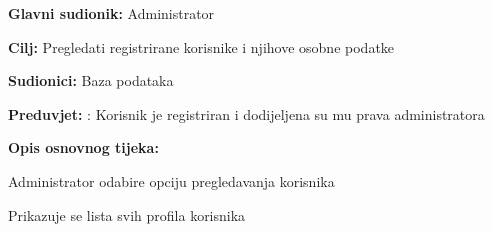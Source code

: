 			
				\noindent {}
				\begin{packed_item}
					
					\item \textbf{Glavni sudionik:} Administrator
					\item  \textbf{Cilj:} Pregledati registrirane korisnike i njihove osobne podatke
					\item  \textbf{Sudionici:} Baza podataka
					\item  \textbf{Preduvjet:} : Korisnik je registriran i dodijeljena su mu prava administratora
					\item  \textbf{Opis osnovnog tijeka:}
					
					\item[] \begin{packed_enum}
						
						\item Administrator odabire opciju pregledavanja korisnika
						\item Prikazuje se lista svih profila korisnika
						
					\end{packed_enum}
					
				\end{packed_item}
				
				
				
				
				
